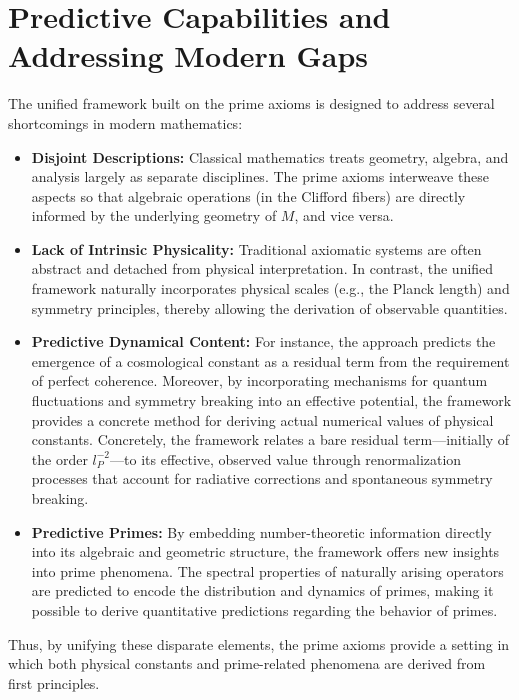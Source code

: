 \documentclass[12pt]{article}
\begin{document}
\section*{Predictive Capabilities and Addressing Modern Gaps}
The unified framework built on the prime axioms is designed to address several shortcomings in modern mathematics:
\begin{itemize}
    \item \textbf{Disjoint Descriptions:} Classical mathematics treats geometry, algebra, and analysis largely as separate disciplines. The prime axioms interweave these aspects so that algebraic operations (in the Clifford fibers) are directly informed by the underlying geometry of \(M\), and vice versa.
    \item \textbf{Lack of Intrinsic Physicality:} Traditional axiomatic systems are often abstract and detached from physical interpretation. In contrast, the unified framework naturally incorporates physical scales (e.g., the Planck length) and symmetry principles, thereby allowing the derivation of observable quantities.
    \item \textbf{Predictive Dynamical Content:} For instance, the approach predicts the emergence of a cosmological constant as a residual term from the requirement of perfect coherence. Moreover, by incorporating mechanisms for quantum fluctuations and symmetry breaking into an effective potential, the framework provides a concrete method for deriving actual numerical values of physical constants. Concretely, the framework relates a bare residual term---initially of the order \(l_P^{-2}\)---to its effective, observed value through renormalization processes that account for radiative corrections and spontaneous symmetry breaking.
    \item \textbf{Predictive Primes:} By embedding number-theoretic information directly into its algebraic and geometric structure, the framework offers new insights into prime phenomena. The spectral properties of naturally arising operators are predicted to encode the distribution and dynamics of primes, making it possible to derive quantitative predictions regarding the behavior of primes.
\end{itemize}
Thus, by unifying these disparate elements, the prime axioms provide a setting in which both physical constants and prime-related phenomena are derived from first principles.
\end{document}
